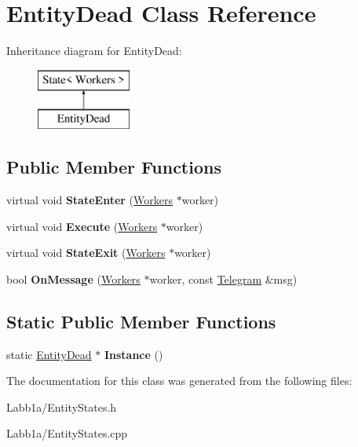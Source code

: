 \hypertarget{class_entity_dead}{}\section{Entity\+Dead Class Reference}
\label{class_entity_dead}
Inheritance diagram for Entity\+Dead\+:\begin{figure}[H]
\begin{center}
\leavevmode
\includegraphics[height=2.000000cm]{class_entity_dead}
\end{center}
\end{figure}
\subsection*{Public Member Functions}
\begin{DoxyCompactItemize}
\item 
\hypertarget{class_entity_dead_a8591fb80ef0fda85b69ed30daf0c87ea}{}virtual void {\bfseries State\+Enter} (\hyperlink{class_workers}{Workers} $\ast$worker)\label{class_entity_dead_a8591fb80ef0fda85b69ed30daf0c87ea}

\item 
\hypertarget{class_entity_dead_a9268fe0bece256533c88e1d3dfefb992}{}virtual void {\bfseries Execute} (\hyperlink{class_workers}{Workers} $\ast$worker)\label{class_entity_dead_a9268fe0bece256533c88e1d3dfefb992}

\item 
\hypertarget{class_entity_dead_a29c8d2b1e807d82cea45e540b5d88fc1}{}virtual void {\bfseries State\+Exit} (\hyperlink{class_workers}{Workers} $\ast$worker)\label{class_entity_dead_a29c8d2b1e807d82cea45e540b5d88fc1}

\item 
\hypertarget{class_entity_dead_aca94d2ec768f14f92df6111fabd19277}{}bool {\bfseries On\+Message} (\hyperlink{class_workers}{Workers} $\ast$worker, const \hyperlink{struct_telegram}{Telegram} \&msg)\label{class_entity_dead_aca94d2ec768f14f92df6111fabd19277}

\end{DoxyCompactItemize}
\subsection*{Static Public Member Functions}
\begin{DoxyCompactItemize}
\item 
\hypertarget{class_entity_dead_aabb45af19bdee64336b4e6be98677303}{}static \hyperlink{class_entity_dead}{Entity\+Dead} $\ast$ {\bfseries Instance} ()\label{class_entity_dead_aabb45af19bdee64336b4e6be98677303}

\end{DoxyCompactItemize}


The documentation for this class was generated from the following files\+:\begin{DoxyCompactItemize}
\item 
Labb1a/Entity\+States.\+h\item 
Labb1a/Entity\+States.\+cpp\end{DoxyCompactItemize}
